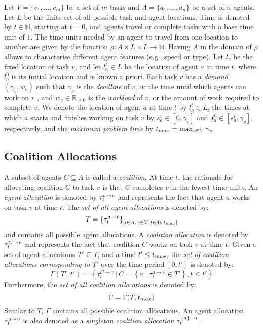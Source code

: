 Let $V = \{ v_1, \dots, v_m \}$ be a set of $m$ tasks and $A = \{ a_1, \dots, a_n \}$ be a
set of $n$ agents. Let $L$ be the finite set of all possible task and agent locations.
Time is denoted by $t \in \mathbb{N}$, starting at $t = 0$, and agents travel or complete
tasks with a base time unit of $1$. The time units needed by an agent to travel from one
location to another are given by the function $\rho : A \times L \times L \rightarrow
\mathbb{N}$. Having $A$ in the domain of $\rho$ allows to characterise different agent
features (e.g., speed or type). Let $l_v$ be the fixed location of task $v$, and let
$l_a^t \in L$ be the location of agent $a$ at time $t$, where $l_a^0$ is its initial
location and is known a priori.
Each task $v$ has a \emph{demand} $(\gamma_v, w_v)$ such that $\gamma_v$ is the
\emph{deadline} of $v$, or the time until which agents can work on $v$
\cite{nunes2017taxonomy}, and $w_v \in \mathbb{R}_{\geq 0}$ is the \emph{workload} of $v$,
or the amount of work required to complete $v$.
We denote the location of agent $a$ at time $t$ by $l_a^t \in L$, the
times at which $a$ starts and finishes working on task $v$ by $s_a^v \in
[0, \gamma_v]$ and $f_a^v \in [s_a^v, \gamma_v]$, respectively, and the \emph{maximum
problem time} by $t_{max} = \max_{v \in V} \gamma_v$.

\subsection{Coalition Allocations}\label{sec:ca}

A subset of agents $C \subseteq A$ is called a \emph{coalition}. At time $t$, the
rationale for allocating coalition $C$ to task $v$ is that $C$ completes $v$ in the fewest
time units. An \emph{agent allocation} is denoted by $\tau^{a \rightarrow v}_{t}$ and represents the
fact that agent $a$ works on task $v$ at time $t$. The \emph{set of all agent allocations}
is denoted by:
\begin{equation}
    T = \left\{ \tau^{a \rightarrow v}_{t} \right\}_{a \in A,\, v \in V,\, t \in [0,\, t_{max}]}
\end{equation}
and contains all possible agent allocations.
A \emph{coalition allocation} is denoted by $\tau^{C \rightarrow v}_{t}$ and represents the fact that
coalition $C$ works on task $v$ at time $t$. Given a set of agent allocations $T'
\subseteq T$, and a time $t' \leq t_{max}$, the \emph{set of coalition allocations
corresponding to} $T'$ over the time period $[0, t']$ is denoted by:
\begin{equation}\label{eq:gtp}
    \Gamma(T', t') = \left\{ \tau_t^{C \rightarrow v} \, | \, C = \left\{ a\; | \;
    \tau_t^{a \rightarrow v} \in T' \right\}, t \leq t' \right\}
\end{equation}
Furthermore, the \emph{set of all coalition allocations} is denoted by:
\begin{equation}
    \Gamma = \Gamma(T, t_{max})
\end{equation}
Similar to $T$, $\Gamma$ contains all possible coalition allocations.
An agent allocation $\tau^{a \rightarrow v}_{t}$ is also denoted as a \emph{singleton coalition
allocation} $\tau^{\{a\} \rightarrow v}_{t}$.

